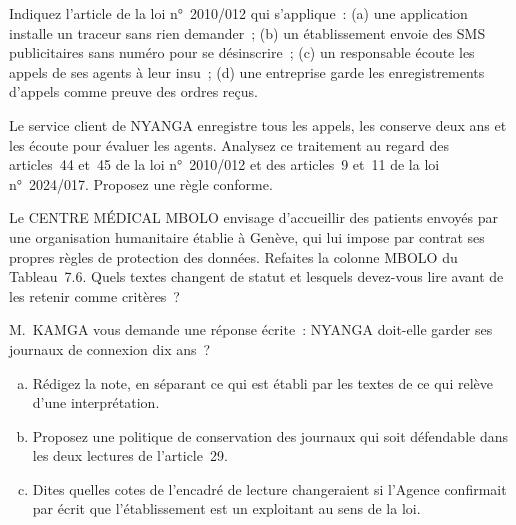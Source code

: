 \begin{boxexo}[title={\ding{45}\quad Exercice~7.1. Quel article \niveaubase}]
Indiquez l'article de la loi n°~2010/012 qui s'applique~: (a) une
application installe un traceur sans rien demander~; (b) un établissement
envoie des SMS publicitaires sans numéro pour se désinscrire~; (c) un
responsable écoute les appels de ses agents à leur insu~; (d) une entreprise
garde les enregistrements d'appels comme preuve des ordres reçus.
\end{boxexo}

\begin{boxexo}[title={\ding{45}\quad Exercice~7.2. Les appels enregistrés \niveaumoyen}]
Le service client de NYANGA enregistre tous les appels, les conserve deux
ans et les écoute pour évaluer les agents. Analysez ce traitement au regard
des articles~44 et~45 de la loi n°~2010/012 et des articles~9 et~11 de la
loi n°~2024/017. Proposez une règle conforme.
\end{boxexo}

\begin{boxexo}[title={\ding{45}\quad Exercice~7.3. La carte de MBOLO \niveaumoyen}]
Le CENTRE MÉDICAL MBOLO envisage d'accueillir des patients envoyés par une
organisation humanitaire établie à Genève, qui lui impose par contrat ses
propres règles de protection des données. Refaites la colonne MBOLO du
Tableau~7.6. Quels textes changent de statut et lesquels devez-vous lire
avant de les retenir comme critères~?
\end{boxexo}

\begin{boxexo}[title={\ding{45}\quad Exercice~7.4. Dix ans ou le nécessaire \niveauexpert}]
M.~KAMGA vous demande une réponse écrite~: NYANGA doit-elle garder ses
journaux de connexion dix ans~?
\begin{enumerate}[(a)]
    \item Rédigez la note, en séparant ce qui est établi par les textes de
          ce qui relève d'une interprétation.
    \item Proposez une politique de conservation des journaux qui soit
          défendable dans les deux lectures de l'article~29.
    \item Dites quelles cotes de l'encadré de lecture changeraient si
          l'Agence confirmait par écrit que l'établissement est un
          exploitant au sens de la loi.
\end{enumerate}
\end{boxexo}

